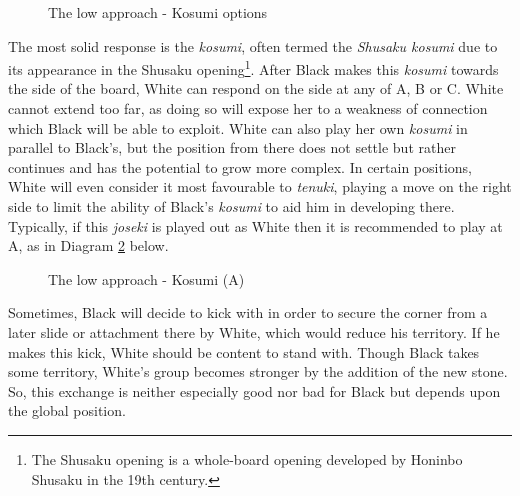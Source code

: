 \documentclass[a5paper,12pt,twoside]{book} %
\newcounter{joseki}                 %
\newcommand{\dref}[1]{Diagram \ref{#1}}
\begin{document}
\begin{figure}[!htbp]
 
\vspace{-0.6cm}\caption{The low approach - Kosumi options}
\label{3-4:low-kosumi-options}
\end{figure}

The most solid response is the \textit{kosumi}, often termed the \textit{Shusaku kosumi} due to its appearance in the Shusaku opening\footnote{The Shusaku opening is a whole-board opening developed by Honinbo Shusaku in the 19th century.}. After Black makes this \textit{kosumi} towards the side of the board, White can respond on the side at any of A, B or C. White cannot extend too far, as doing so will expose her to a weakness of connection which Black will be able to exploit. White can also play her own \textit{kosumi} in parallel to Black's, but the position from there does not settle but rather continues and has the potential to grow more complex. In certain positions, White will even consider it most favourable to \textit{tenuki}, playing a move on the right side to limit the ability of Black's \textit{kosumi} to aid him in developing there.\\

Typically, if this \textit{joseki} is played out as White then it is recommended to play at A, as in \dref{3-4:low-kosumi-A} below.\\

\begin{figure}[!htbp]
 
\vspace{-0.6cm}\caption{The low approach - Kosumi (A)}
\label{3-4:low-kosumi-A}
\end{figure}

Sometimes, Black will decide to kick with{\large\blackstone[4]} in order to secure the corner from a later slide or attachment there by White, which would reduce his territory. If he makes this kick, White should be content to stand with{\large\whitestone[5]}. Though Black takes some territory, White's group becomes stronger by the addition of the new stone. So, this exchange is neither especially good nor bad for Black but depends upon the global position.\\

% 
\end{document}
